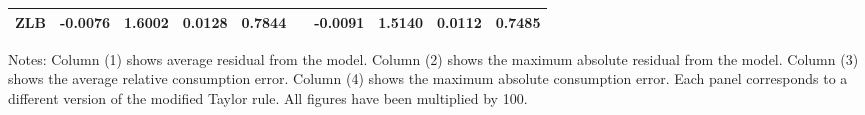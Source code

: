 \begin{table}[H]
\begin{threeparttable}
\begin{tabular}{lccccrlccc}
    ZLB   & -0.0076 & 1.6002 & 0.0128 & 0.7844 &       & \multicolumn{1}{c}{-0.0091} & 1.5140 & 0.0112 & 0.7485 \\
    \bottomrule
    \end{tabular}%
    \begin{tablenotes}
    	{\footnotesize {\sc Notes:} Column (1) shows average residual from the model. Column (2) shows the maximum absolute residual from the model. Column (3) shows the average relative consumption error. Column (4) shows the maximum absolute consumption error. Each panel corresponds to a different version of the modified Taylor rule. All figures have been multiplied by 100.}
    \end{tablenotes}
	\end{threeparttable}	
  \label{tab:app_error}%
\end{table}%